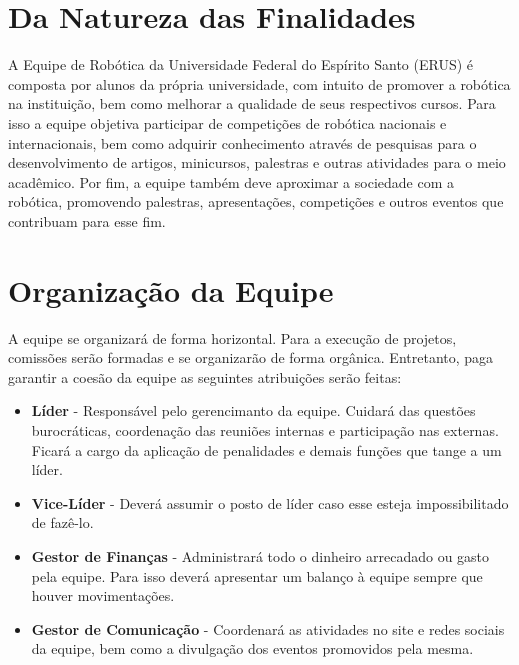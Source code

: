 \chapter{Da Natureza das Finalidades}
\label{chp:natureza}

A Equipe de Robótica da Universidade Federal do Espírito Santo (ERUS) é composta por alunos da própria universidade, com intuito de promover a robótica na instituição, bem como melhorar a qualidade de seus respectivos cursos. Para isso a equipe objetiva participar de competições de robótica nacionais e internacionais, bem como adquirir conhecimento através de pesquisas para o desenvolvimento de artigos, minicursos, palestras e outras atividades para o meio acadêmico. Por fim, a equipe também deve aproximar a sociedade com a robótica, promovendo palestras, apresentações, competições e outros eventos que contribuam para esse fim. 


\chapter{Organização da Equipe}
\label{chp:organizacao}

A equipe se organizará de forma horizontal. Para a execução de projetos, comissões serão formadas e se organizarão de forma orgânica. Entretanto, paga garantir a coesão da equipe as seguintes atribuições serão feitas:

\begin{itemize}
  \item[] \textbf{Líder} - Responsável pelo gerencimanto da equipe. Cuidará das questões burocráticas, coordenação das reuniões internas e participação nas externas. Ficará a cargo da aplicação de penalidades e demais funções que tange a um líder. 
  \item[] \textbf{Vice-Líder} - Deverá assumir o posto de líder caso esse esteja impossibilitado de fazê-lo.
  \item[] \textbf{Gestor de Finanças} - Administrará todo o dinheiro arrecadado ou gasto pela equipe. Para isso deverá apresentar um balanço à equipe sempre que houver movimentações.
  \item[] \textbf{Gestor de Comunicação} - Coordenará as atividades no site e redes sociais da equipe, bem como a divulgação dos eventos promovidos pela mesma.
\end{itemize}


